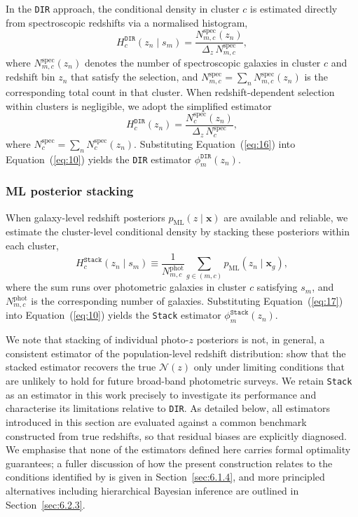 In the \texttt{DIR} approach, the conditional density in cluster \(c\) is estimated directly from spectroscopic redshifts via a normalised histogram,
\begin{equation} \label{eq:15}
    H_c^\texttt{DIR}(z_n \mid s_m) = \frac{N_{m,c}^\mathrm{spec}(z_n)}{\Delta_z \, N_{m,c}^\mathrm{spec}},
\end{equation}
where \(N_{m,c}^\mathrm{spec}(z_n)\) denotes the number of spectroscopic galaxies in cluster \(c\) and redshift bin \(z_n\) that satisfy the selection, and \(N_{m,c}^\mathrm{spec} = \sum_n N_{m,c}^\mathrm{spec}(z_n)\) is the corresponding total count in that cluster. When redshift-dependent selection within clusters is negligible, we adopt the simplified estimator
\begin{equation} \label{eq:16}
    H_c^\texttt{DIR}(z_n) = \frac{N_c^\mathrm{spec}(z_n)}{\Delta_z \, N_c^\mathrm{spec}},
\end{equation}
where \(N_c^\mathrm{spec}=\sum_n N_c^\mathrm{spec}(z_n)\). Substituting Equation~(\ref{eq:16}) into Equation~(\ref{eq:10}) yields the \texttt{DIR} estimator \(\phi_m^\texttt{DIR}(z_n)\).

\subsubsection{ML posterior stacking} \label{sec:2.2.2}

When galaxy-level redshift posteriors \(p_\mathrm{ML}(z \mid \mathbf{x})\) are available and reliable, we estimate the cluster-level conditional density by stacking these posteriors within each cluster,
\begin{equation} \label{eq:17}
    H_c^\texttt{Stack}(z_n \mid s_m) \equiv \frac{1}{N_{m,c}^\mathrm{phot}} \sum_{g \in (m,c)} p_\mathrm{ML}(z_n \mid \mathbf{x}_g),
\end{equation}
where the sum runs over photometric galaxies in cluster \(c\) satisfying \(s_m\), and \(N_{m,c}^\mathrm{phot}\) is the corresponding number of galaxies. Substituting Equation~(\ref{eq:17}) into Equation~(\ref{eq:10}) yields the \texttt{Stack} estimator \(\phi_m^\texttt{Stack}(z_n)\).

We note that stacking of individual photo-\(z\) posteriors is not, in general, a consistent estimator of the population-level redshift distribution: \citet{2021PhRvD.103h3502M} show that the stacked estimator recovers the true \(\mathcal{N}(z)\) only under limiting conditions that are unlikely to hold for future broad-band photometric surveys. We retain \texttt{Stack} as an estimator in this work precisely to investigate its performance and characterise its limitations relative to \texttt{DIR}. As detailed below, all estimators introduced in this section are evaluated against a common benchmark constructed from true redshifts, so that residual biases are explicitly diagnosed. We emphasise that none of the estimators defined here carries formal optimality guarantees; a fuller discussion of how the present construction relates to the conditions identified by \citet{2021PhRvD.103h3502M} is given in Section~\ref{sec:6.1.4}, and more principled alternatives including hierarchical Bayesian inference are outlined in Section~\ref{sec:6.2.3}.

